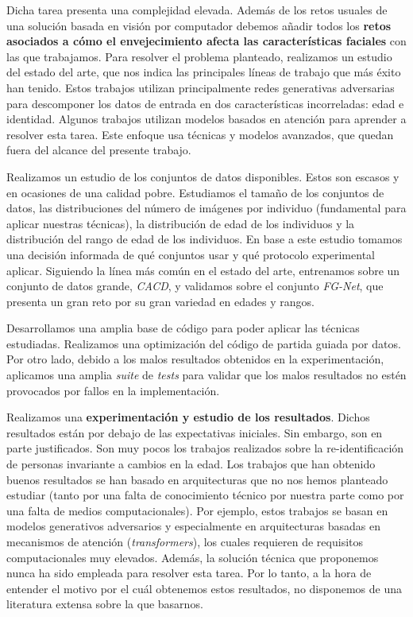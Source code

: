 Dicha tarea presenta una complejidad elevada. Además de los retos usuales de una solución basada en visión por computador debemos añadir todos los \textbf{retos asociados a cómo el envejecimiento afecta las características faciales} con las que trabajamos. Para resolver el problema planteado, realizamos un estudio del estado del arte, que nos indica las principales líneas de trabajo que más éxito han tenido. Estos trabajos utilizan principalmente redes generativas adversarias para descomponer los datos de entrada en dos características incorreladas: edad e identidad. Algunos trabajos utilizan modelos basados en atención para aprender a resolver esta tarea. Este enfoque usa técnicas y modelos avanzados, que quedan fuera del alcance del presente trabajo.

Realizamos un estudio de los conjuntos de datos disponibles. Estos son escasos y en ocasiones de una calidad pobre. Estudiamos el tamaño de los conjuntos de datos, las distribuciones del número de imágenes por individuo (fundamental para aplicar nuestras técnicas), la distribución de edad de los individuos y la distribución del rango de edad de los individuos. En base a este estudio tomamos una decisión informada de qué conjuntos usar y qué protocolo experimental aplicar. Siguiendo la línea más común en el estado del arte, entrenamos sobre un conjunto de datos grande, \textit{CACD}, y validamos sobre el conjunto \textit{FG-Net}, que presenta un gran reto por su gran variedad en edades y rangos.

Desarrollamos una amplia base de código para poder aplicar las técnicas estudiadas. Realizamos una optimización del código de partida guiada por datos. Por otro lado, debido a los malos resultados obtenidos en la experimentación, aplicamos una amplia \textit{suite} de \textit{tests} para validar que los malos resultados no estén provocados por fallos en la implementación.

Realizamos una \textbf{experimentación y estudio de los resultados}. Dichos resultados están por debajo de las expectativas iniciales. Sin embargo, son en parte justificados. Son muy pocos los trabajos realizados sobre la re-identificación de personas invariante a cambios en la edad. Los trabajos que han obtenido buenos resultados se han basado en arquitecturas que no nos hemos planteado estudiar (tanto por una falta de conocimiento técnico por nuestra parte como por una falta de medios computacionales). Por ejemplo, estos trabajos se basan en modelos generativos adversarios y especialmente en arquitecturas basadas en mecanismos de atención (\textit{transformers}), los cuales requieren de requisitos computacionales muy elevados. Además, la solución técnica que proponemos nunca ha sido empleada para resolver esta tarea. Por lo tanto, a la hora de entender el motivo por el cuál obtenemos estos resultados, no disponemos de una literatura extensa sobre la que basarnos.

